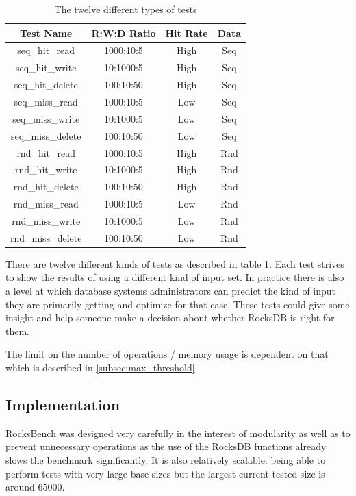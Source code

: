 \documentclass[twocolumn,11pt]{article}
\begin{document}
\begin{table}[h!]
  \begin{tabular}{ |c|c|c|c| }
    \hline
    Test Name & R:W:D Ratio & Hit Rate & Data \\
    \hline \hline
    seq\_hit\_read & 1000:10:5 & High & Seq \\ \hline
    seq\_hit\_write & 10:1000:5 & High & Seq \\ \hline
    seq\_hit\_delete & 100:10:50 & High & Seq \\ \hline
    seq\_miss\_read & 1000:10:5 & Low & Seq \\ \hline
    seq\_miss\_write & 10:1000:5 & Low & Seq \\ \hline
    seq\_miss\_delete & 100:10:50 & Low & Seq \\ \hline
    rnd\_hit\_read & 1000:10:5 & High & Rnd \\ \hline
    rnd\_hit\_write & 10:1000:5 & High & Rnd \\ \hline
    rnd\_hit\_delete & 100:10:50 & High & Rnd \\ \hline
    rnd\_miss\_read & 1000:10:5 & Low & Rnd \\ \hline
    rnd\_miss\_write & 10:1000:5 & Low & Rnd \\ \hline
    rnd\_miss\_delete & 100:10:50 & Low & Rnd \\ \hline
  \end{tabular}
  \caption{The twelve different types of tests}
  \label{tab:types_of_tests}
\end{table}

There are twelve different kinds of tests as described in table
\ref{tab:types_of_tests}. Each test strives to show the results of using a
different kind of input set. In practice there is also a level at which database
systems administrators can predict the kind of input they are primarily getting
and optimize for that case. These tests could give some insight and help someone
make a decision about whether RocksDB is right for them.

The limit on the number of operations / memory usage is dependent on that which
is described in \ref{subsec:max_threshold}.

\subsection{Implementation}

RocksBench was designed very carefully in the interest of modularity as well as
to prevent unnecessary operations as the use of the RocksDB functions already
slows the benchmark significantly. It is also relatively scalable: being able to
perform tests with very large base sizes but the largest current tested size is
around 65000.
\end{document}
